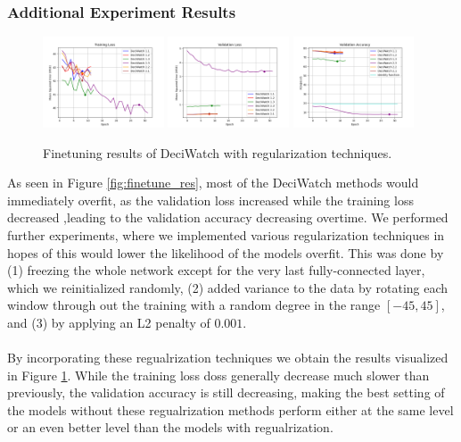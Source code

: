 \documentclass[./main.tex]{subfiles}
\begin{document}
\subsubsection{Additional Experiment Results}
\begin{figure}
    \centering
    \includegraphics[width=0.32\textwidth]{./entities/finetuned/adapted/train_losses.png}
    \includegraphics[width=0.32\textwidth]{./entities/finetuned/adapted/val_losses.png}
    \includegraphics[width=0.32\textwidth]{./entities/finetuned/adapted/val_accs.png}
    \caption{Finetuning results of DeciWatch with regularization techniques.}
    \label{fig:finetune_res_2}
\end{figure}
As seen in Figure \ref{fig:finetune_res}, most of the DeciWatch methods would immediately overfit, as the validation loss increased while the training loss decreased ,leading to the validation accuracy decreasing overtime. We performed further experiments, where we implemented various regularization techniques in hopes of this would lower the likelihood of the models overfit. This was done by (1) freezing the whole network except for the very last fully-connected layer, which we reinitialized randomly, (2) added variance to the data by rotating each window through out the training with a random degree in the range $[-45, 45]$, and (3) by applying an L2 penalty of $0.001$.
\\
\\
By incorporating these regualrization techniques we obtain the results visualized in Figure \ref{fig:finetune_res_2}. While the training loss doss generally decrease much slower than previously, the validation accuracy is still decreasing, making the best setting of the models without these regualrization methods perform either at the same level or an even better level than the models with regualrization.
\end{document}

